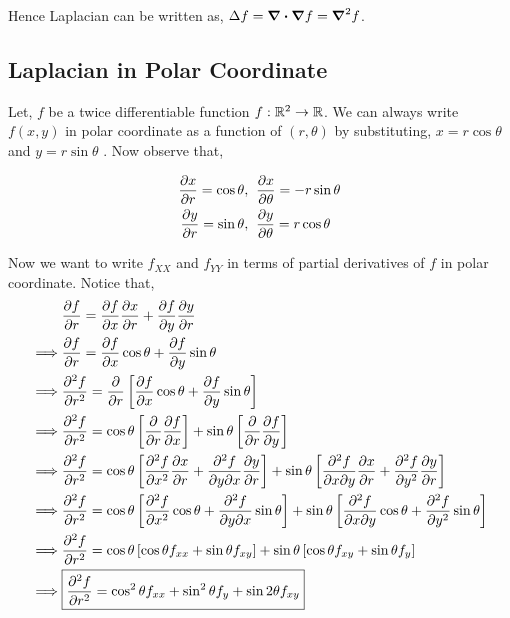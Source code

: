 \documentclass[../Analysis-3.tex]{subfiles}
\begin{document}
Hence Laplacian can be written as, $\Delta f = \div\grad f = \grad ^2 f$.

\subsection*{Laplacian in Polar Coordinate}

Let, $f$ be a twice differentiable function $f: \mathbb{R}^2 \to \mathbb{R}$. We can always write $f(x,y)$ in polar coordinate as a function of $(r,\theta)$ by substituting, $x = r\cos{\theta}$ and $y= r\sin{\theta}$ . Now observe that,

\begin{align*}
    \pdv{x}{r} = \cos{\theta}, \hspace*{0.2cm} & \pdv{x}{\theta} = -r\sin{\theta} \\
    \pdv{y}{r} = \sin{\theta}, \hspace*{0.2cm} & \pdv{y}{\theta} = r\cos{\theta}
\end{align*}

Now we want to write $f_{XX}$ and $f_{YY}$ in terms of partial derivatives of $f$ in polar coordinate. Notice that,
\begin{align*}
             & \pdv{f}{r} = \pdv{f}{x} \pdv{x}{r} + \pdv{f}{y}\pdv{y}{r}                                                                                                                               \\
    \implies & \pdv{f}{r} = \pdv{f}{x} \cos{\theta} + \pdv{f}{y}\sin{\theta}                                                                                                                           \\
    \implies & \pdv[2]{f}{r} = \pdv{}{r} \left[\pdv{f}{x} \cos{\theta} + \pdv{f}{y} \sin{\theta} \right]                                                                                               \\
    \implies & \pdv[2]{f}{r} = \cos{\theta} \left[\pdv{}{r} \pdv{f}{x}\right] + \sin{\theta} \left[\pdv{}{r} \pdv{f}{y} \right]                                                                        \\
    \implies & \pdv[2]{f}{r} = \cos{\theta} \left[\pdv[2]{f}{x} \pdv{x}{r} + \pdv{f}{y}{x} \pdv{y}{r} \right] + \sin{\theta} \left[\pdv{f}{x}{y} \pdv{x}{r} + \pdv[2]{f}{y} \pdv{y}{r} \right]         \\
    \implies & \pdv[2]{f}{r} = \cos{\theta} \left[\pdv[2]{f}{x} \cos{\theta} + \pdv{f}{y}{x} \sin{\theta} \right] + \sin{\theta} \left[\pdv{f}{x}{y} \cos{\theta} + \pdv[2]{f}{y} \sin{\theta} \right] \\
    \implies & \pdv[2]{f}{r} = \cos{\theta} \left[\cos{\theta} f_{xx} + \sin{\theta} f_{xy} \right] + \sin{\theta} \left[\cos{\theta} f_{xy} + \sin{\theta} f_{y} \right]                              \\
    \implies & \boxed{\pdv[2]{f}{r} = \cos^2 \theta f_{xx} + \sin^2 \theta f_{y} + \sin 2 \theta f_{xy}}
\end{align*}
\end{document}
